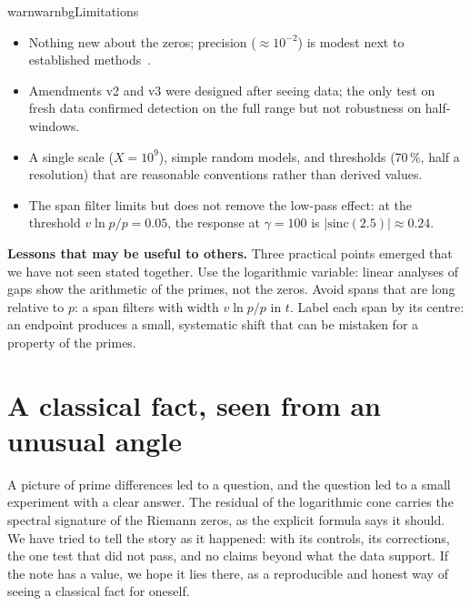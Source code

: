\documentclass[11pt,a4paper]{article}
\newcommand{\para}[1]{\textsf{\bfseries #1}\hspace{0.45em}}
\begin{document}
\begin{notebox}{warn}{warnbg}{Limitations}
\begin{itemize}[leftmargin=1.1em,itemsep=0.35em,topsep=0pt]
\item Nothing new about the zeros; precision ($\approx10^{-2}$) is modest next to established methods~\cite{main}.
\item Amendments v2 and v3 were designed after seeing data; the only test on fresh data confirmed detection on the full range but not robustness on half-windows.
\item A single scale ($X=10^9$), simple random models, and thresholds (70\,\%, half a resolution) that are reasonable conventions rather than derived values.
\item The span filter limits but does not remove the low-pass effect: at the threshold $v\ln p/p=0.05$, the response at $\gamma=100$ is $|\mathrm{sinc}(2.5)|\approx0.24$.
\end{itemize}
\end{notebox}

\para{Lessons that may be useful to others.} Three practical points emerged that we have not seen stated together. Use the logarithmic variable: linear analyses of gaps show the arithmetic of the primes, not the zeros. Avoid spans that are long relative to $p$: a span filters with width $v\ln p/p$ in $t$. Label each span by its centre: an endpoint produces a small, systematic shift that can be mistaken for a property of the primes.

\section{A classical fact, seen from an unusual angle}

A picture of prime differences led to a question, and the question led to a small experiment with a clear answer. The residual of the logarithmic cone carries the spectral signature of the Riemann zeros, as the explicit formula says it should. We have tried to tell the story as it happened: with its controls, its corrections, the one test that did not pass, and no claims beyond what the data support. If the note has a value, we hope it lies there, as a reproducible and honest way of seeing a classical fact for oneself.
\end{document}
